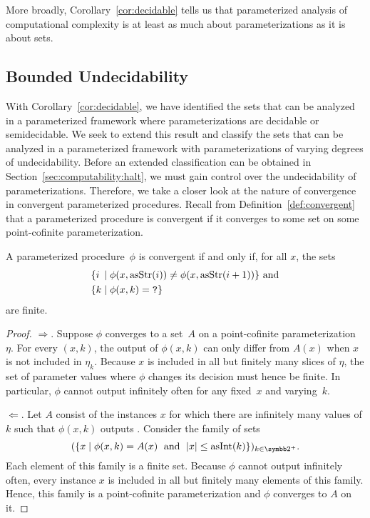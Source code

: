 More broadly, Corollary~\ref{cor:decidable} tells us that parameterized analysis of computational complexity is at least as much about parameterizations as it is about sets.

\subsection{Bounded Undecidability}
\label{sec:computability:bounded}%
With Corollary~\ref{cor:decidable}, we have identified the sets that can be analyzed in a parameterized framework where parameterizations are decidable or semidecidable.
We seek to extend this result and classify the sets that can be analyzed in a parameterized framework with parameterizations of varying degrees of undecidability.
Before an extended classification can be obtained in Section~\ref{sec:computability:halt}, we must gain control over the undecidability of parameterizations.
Therefore, we take a closer look at the nature of convergence in convergent parameterized procedures.
Recall from Definition~\ref{def:convergent} that a parameterized procedure is convergent if it converges to some set on some point-cofinite parameterization.
\begin{lemma}
\label{lem:convergent_finite}%
  A parameterized procedure~$\phi$ is convergent if and only if, for all $x$, the sets
  \begin{align*}
    &\{\mathrlap{i}\hphantom{k} \st \phi(x, \asStr(i)) \neq \phi(x, \asStr(i + 1))\}\text{ and} \\
    &\{k \st \phi(x, k) = \bits{?}\}
  \end{align*}
  are finite.
\end{lemma}
\begin{proof}
  $\Longrightarrow$.
  Suppose $\phi$ converges to a set~$A$ on a point-cofinite parameterization~$\eta$.
  For every $(x, k)$, the output of $\phi(x, k)$ can only differ from $A(x)$ when $x$ is not included in $\eta_k$.
  Because $x$ is included in all but finitely many slices of $\eta$, the set of parameter values where $\phi$ changes its decision must hence be finite.
  In particular, $\phi$ cannot output  infinitely often for any fixed~$x$ and varying~$k$.

  $\Longleftarrow$.
  Let $A$ consist of the instances $x$ for which there are infinitely many values of $k$ such that $\phi(x, k)$ outputs .
  Consider the family of sets
  \begin{equation*}
    (\{x \st \phi(x, k) = A(x) \reland \length{x} \le \asNat(k)\})_{k \in \binary^+}.
  \end{equation*}
  Each element of this family is a finite set.
  Because $\phi$ cannot output  infinitely often, every instance $x$ is included in all but finitely many elements of this family.
  Hence, this family is a point-cofinite parameterization and $\phi$ converges to $A$ on it.
\end{proof}

